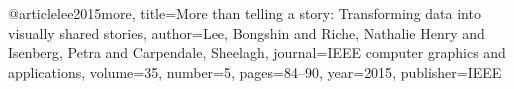 @article{lee2015more,
  title={More than telling a story: Transforming data into visually shared stories},
  author={Lee, Bongshin and Riche, Nathalie Henry and Isenberg, Petra and Carpendale, Sheelagh},
  journal={IEEE computer graphics and applications},
  volume={35},
  number={5},
  pages={84--90},
  year={2015},
  publisher={IEEE}
}